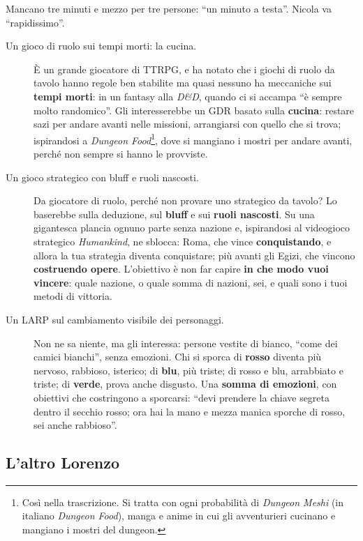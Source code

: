 Mancano tre minuti e mezzo per tre persone: ``un minuto a testa''. Nicola va
``rapidissimo''.
\begin{description}
  \item[Un gioco di ruolo sui tempi morti: la cucina.] È un grande giocatore di
        TTRPG, e ha notato che i giochi di ruolo da tavolo hanno regole ben stabilite
        ma quasi nessuno ha meccaniche sui \textbf{tempi morti}: in un fantasy alla
        \emph{D\&D}, quando ci si accampa ``è sempre molto randomico''. Gli
        interesserebbe un GDR basato sulla \textbf{cucina}: restare sazi per andare
        avanti nelle missioni, arrangiarsi con quello che si trova; ispirandosi a
        \emph{Dungeon Food}\footnote{Così nella trascrizione. Si tratta con ogni
        probabilità di \emph{Dungeon Meshi} (in italiano \emph{Dungeon Food}),
        manga e anime in cui gli avventurieri cucinano e mangiano i mostri del
        dungeon.}, dove si mangiano i mostri per andare avanti, perché non sempre si
        hanno le provviste.
  \item[Un gioco strategico con bluff e ruoli nascosti.] Da giocatore di ruolo, perché
        non provare uno strategico da tavolo? Lo baserebbe sulla deduzione, sul
        \textbf{bluff} e sui \textbf{ruoli nascosti}. Su una gigantesca plancia ognuno
        parte senza nazione e, ispirandosi al videogioco strategico \emph{Humankind},
        ne sblocca: Roma, che vince \textbf{conquistando}, e allora la tua strategia
        diventa conquistare; più avanti gli Egizi, che vincono \textbf{costruendo
        opere}. L'obiettivo è non far capire \textbf{in che modo vuoi vincere}: quale
        nazione, o quale somma di nazioni, sei, e quali sono i tuoi metodi di vittoria.
  \item[Un LARP sul cambiamento visibile dei personaggi.] Non ne sa niente, ma gli
        interessa: persone vestite di bianco, ``come dei camici bianchi'', senza
        emozioni. Chi si sporca di \textbf{rosso} diventa più nervoso, rabbioso,
        isterico; di \textbf{blu}, più triste; di rosso e blu, arrabbiato e triste;
        di \textbf{verde}, prova anche disgusto. Una \textbf{somma di emozioni}, con
        obiettivi che costringono a sporcarsi: ``devi prendere la chiave segreta dentro
        il secchio rosso; ora hai la mano e mezza manica sporche di rosso, sei anche
        rabbioso''.
\end{description}

\subsection{L'altro Lorenzo}
\label{a7:sec:idee-lorenzo}

